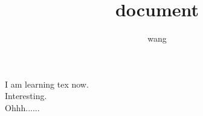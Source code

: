 \documentclass{article}
\title{document}
\author{wang}
\begin{document}
\maketitle
I am learning tex now.\\ Interesting.\\Ohhh......
\end{document}
